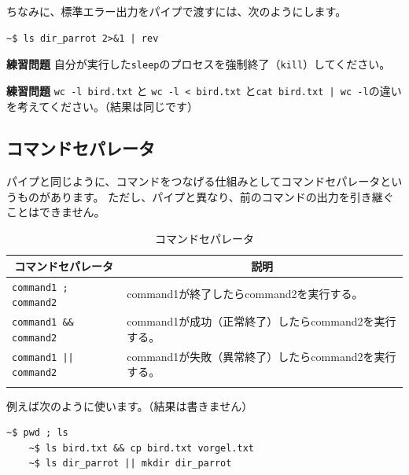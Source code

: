 \documentclass[a4j]{ltjsreport}
\begin{document}
    ちなみに、標準エラー出力をパイプで渡すには、次のようにします。
    \begin{lstlisting}[numbers=none]
    ~$ ls dir_parrot 2>&1 | rev
    \end{lstlisting}

    \begin{itembox}[l]{\textbf{練習問題}}
        自分が実行した\texttt{sleep}のプロセスを強制終了（\texttt{kill}）してください。
    \end{itembox}

    \begin{itembox}[l]{\textbf{練習問題}}
        \texttt{wc -l bird.txt} と \texttt{wc -l < bird.txt} と\texttt{cat bird.txt | wc -l}の違いを考えてください。（結果は同じです）
    \end{itembox}

    \subsection{コマンドセパレータ}
    パイプと同じように、コマンドをつなげる仕組みとしてコマンドセパレータというものがあります。
    ただし、パイプと異なり、前のコマンドの出力を引き継ぐことはできません。
    \begin{longtable}[c]{|l|l|}
        \hline
        \multicolumn{1}{|c|}{\textbf{コマンドセパレータ}}&\multicolumn{1}{|c|}{\textbf{説明}}\\
        \hline\hline
        \texttt{command1 ; command2} &command1が終了したらcommand2を実行する。\\
        \hline
        \texttt{command1 \&\& command2} &command1が成功（正常終了）したらcommand2を実行する。\\
        \hline
        \texttt{command1 || command2} &command1が失敗（異常終了）したらcommand2を実行する。\\
        \hline
        \caption{コマンドセパレータ}
    \end{longtable}

    例えば次のように使います。（結果は書きません）
    \begin{lstlisting}[numbers=none]
    ~$ pwd ; ls
    ~$ ls bird.txt && cp bird.txt vorgel.txt
    ~$ ls dir_parrot || mkdir dir_parrot
    \end{lstlisting}
\end{document}
